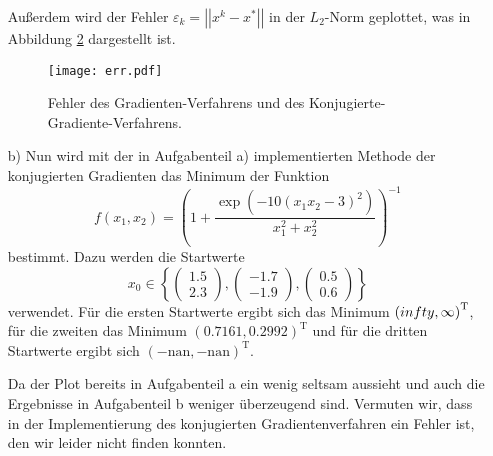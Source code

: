 \begin{itemize}[leftmargin=*]
\begin{figure}[H]
              \label{fig:a1_2}
          \end{figure}
          \FloatBarrier
          \noindent
          Außerdem wird der Fehler $\varepsilon_k = \left| \left|x^k - x^{*} \right| \right|$ in der $L_2$-Norm
          geplottet, was in Abbildung \ref{fig:a1_3} dargestellt ist.
          \FloatBarrier
          \begin{figure}[H]
              \centering
              \texttt{[image: err.pdf]}
              \caption{Fehler des Gradienten-Verfahrens und des Konjugierte-Gradiente-Verfahrens.}
              \label{fig:a1_3}
          \end{figure}
          \FloatBarrier
          \noindent
\item[b)] Nun wird mit der in Aufgabenteil a) implementierten Methode der konjugierten Gradienten das Minimum
          der Funktion
          \begin{equation*}
            f\left(x_1, x_2\right) = \left(1 + \frac{\exp \left(-10 \left(x_1 x_2 -3\right)^2\right)}{x_1^2 + x_2^2}\right)^{-1}
          \end{equation*}
          bestimmt. Dazu werden die Startwerte
          \begin{equation*}
            x_0 \in \left\{\begin{pmatrix}
              1.5 \\
              2.3
            \end{pmatrix}, \begin{pmatrix}
              -1.7 \\
              -1.9
            \end{pmatrix}, \begin{pmatrix}
              0.5 \\
              0.6
            \end{pmatrix} \right\}
          \end{equation*}
          verwendet. Für die ersten Startwerte ergibt sich das Minimum $\left(\-infty, \infty \right)^{\text{T}}$, für die zweiten das Minimum $\left(0.7161, 0.2992\right)^{\text{T}}$ und für die dritten Startwerte ergibt sich
          $\left(-\text{nan},-\text{nan}\right)^{\text{T}}$.

        Da der Plot bereits in Aufgabenteil a ein wenig seltsam aussieht und auch die Ergebnisse in Aufgabenteil b weniger überzeugend sind. Vermuten wir, dass in der Implementierung des konjugierten Gradientenverfahren ein Fehler ist, den wir leider nicht finden konnten.
\end{itemize}

